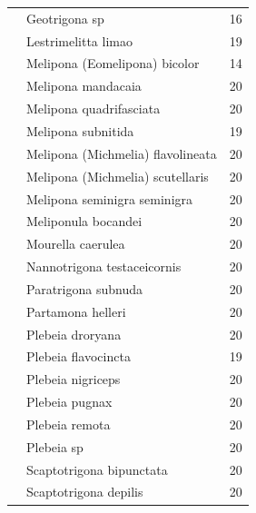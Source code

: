 \documentclass[
	12pt,				%
	oneside,			%
	a4paper,			%
	english,			%
	brazil				%
	]{abntex2ppgsi}
\begin{document}
\begin{longtable}[c]{|l|l|r|}
                       & Geotrigona sp                      & 16 \\ \cline{2-3} 
                       & Lestrimelitta limao                & 19 \\ \cline{2-3} 
                       & Melipona (Eomelipona) bicolor      & 14 \\ \cline{2-3} 
                       & Melipona mandacaia                 & 20 \\ \cline{2-3} 
                       & Melipona quadrifasciata            & 20 \\ \cline{2-3} 
                       & Melipona subnitida                 & 19 \\ \cline{2-3} 
                       & Melipona (Michmelia) flavolineata  & 20 \\ \cline{2-3} 
                       & Melipona (Michmelia) scutellaris   & 20 \\ \cline{2-3} 
                       & Melipona seminigra seminigra       & 20 \\ \cline{2-3} 
                       & Meliponula bocandei                & 20 \\ \cline{2-3} 
                       & Mourella caerulea                  & 20 \\ \cline{2-3} 
                       & Nannotrigona testaceicornis        & 20 \\ \cline{2-3} 
                       & Paratrigona subnuda                & 20 \\ \cline{2-3} 
                       & Partamona helleri                  & 20 \\ \cline{2-3} 
                       & Plebeia droryana                   & 20 \\ \cline{2-3} 
                       & Plebeia flavocincta                & 19 \\ \cline{2-3} 
                       & Plebeia nigriceps                  & 20 \\ \cline{2-3} 
                       & Plebeia pugnax                     & 20 \\ \cline{2-3} 
                       & Plebeia remota                     & 20 \\ \cline{2-3} 
                       & Plebeia sp                         & 20 \\ \cline{2-3} 
                       & Scaptotrigona bipunctata           & 20 \\ \cline{2-3} 
                       & Scaptotrigona depilis              & 20 \\ \cline{2-3} 

\end{longtable}
\end{document}
